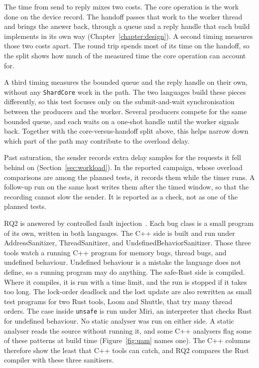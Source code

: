\documentclass[english,oneside,a4paper,censored,csm,software-track-2020]{HYthesisML}
\begin{document}
The time from send to reply mixes two costs. The core operation is the work
done on the device record. The handoff passes that work to the worker thread
and brings the answer back, through a queue and a reply handle that each build
implements in its own way (Chapter~\ref{chapter:design}). A second timing
measures those two costs apart. The round trip spends most of its time on the
handoff, so the split shows how much of the measured time the core operation
can account for. 

A third timing measures the bounded queue and the reply handle on their own, 
without any \texttt{ShardCore} work in the path. 
The two languages build these pieces differently, so this test focuses only on 
the submit-and-wait synchronisation between the producers and the worker. 
Several producers compete for the same bounded queue, and each waits on a
one-shot handle until the worker signals back. Together with the core-versus-handoff
split above, this helps narrow down which part of the path may contribute to the 
overload delay.

Past saturation, the sender records extra delay samples for the requests it
fell behind on (Section~\ref{sec:workload}). In the reported campaign, whose
overload comparisons are among the planned tests, it records them while the
timer runs. A follow-up run on the same host writes them after the timed
window, so that the recording cannot slow the sender. It is reported as a
check, not as one of the planned tests.

RQ2 is answered by controlled fault injection~\cite{natella2016fault}. Each
bug class is a small program of its own, written in both languages. The C++
side is built and run under AddressSanitizer, ThreadSanitizer, and
UndefinedBehaviorSanitizer. Those three tools watch a running C++ program
for memory bugs, thread bugs, and undefined behaviour. Undefined behaviour
is a mistake the language does not define, so a running program may do
anything. The safe-Rust side is compiled. Where it compiles, it is run with
a time limit, and the run is stopped if it takes too long. The lock-order
deadlock and the lost update are also rewritten as small test programs for
two Rust tools, Loom and Shuttle, that try many thread orders. The case
inside \texttt{unsafe} is run under Miri, an interpreter that checks Rust for
undefined behaviour.
No static analyser was run on either side. A static
analyser reads the source without running it, and some C++ analysers flag
some of these patterns at build time (Figure~\ref{fig:uam} names one). The
C++ columns therefore show the least that C++ tools can catch, and RQ2
compares the Rust compiler with these three sanitisers.
\end{document}
